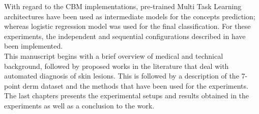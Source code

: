 With regard to the CBM implementations, pre-trained Multi Task Learning architectures have been used as intermediate models for the concepts prediction; whereas logistic regression model was used for the final classification. For these experiments, the independent and sequential configurations described in \cite{CBM} have been implemented.\\
This manuscript begins with a brief overview of medical and technical background, followed by proposed works in the literature that deal with automated diagnosis of skin lesions. This is followed by a description of the 7-point derm dataset and the methods that have been used for the experiments. The last chapters presents the experimental setups and results obtained in the experiments as well as a conclusion to the work.

